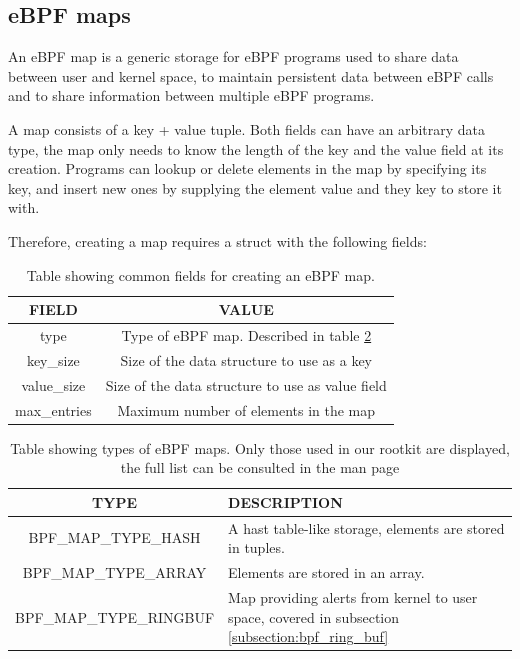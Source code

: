 \documentclass[12pt]{report} %
\begin{document}
\subsection{eBPF maps}
An eBPF map is a generic storage for eBPF programs used to share data between user and kernel space, to maintain persistent data between eBPF calls and to share information between multiple eBPF programs\cite{ebpf_maps_kernel}.

A map consists of a key + value tuple. Both fields can have an arbitrary data type, the map only needs to know the length of the key and the value field at its creation\cite{bpf_syscall}. Programs can lookup or delete elements in the map by specifying its key, and insert new ones by supplying the element value and they key to store it with.

Therefore, creating a map requires a struct with the following fields:

\begin{table}[H]
\begin{tabular}{|c|c|}
\hline
FIELD & VALUE\\
\hline
type & Type of eBPF map. Described in table \ref{table:ebpf_map_types}\\
key\_size & Size of the data structure to use as a key\\
value\_size & Size of the data structure to use as value field\\
max\_entries & Maximum number of elements in the map\\
\hline
\end{tabular}
\caption{Table showing common fields for creating an eBPF map.}
\label{table:ebpf_map_struct}
\end{table}

\begin{table}[H]
\begin{tabular}{|c|>{\centering\arraybackslash}p{10cm}|}
\hline
TYPE & DESCRIPTION\\
\hline
BPF\_MAP\_TYPE\_HASH & A hast table-like storage, elements are stored in tuples.\\
BPF\_MAP\_TYPE\_ARRAY & Elements are stored in an array.\\
BPF\_MAP\_TYPE\_RINGBUF & Map providing alerts from kernel to user space, covered in subsection \ref{subsection:bpf_ring_buf}\\
\hline
\end{tabular}
\caption{Table showing types of eBPF maps. Only those used in our rootkit are displayed, the full list can be consulted in the man page \cite{bpf_syscall}}
\label{table:ebpf_map_types}
\end{table}
\end{document}
